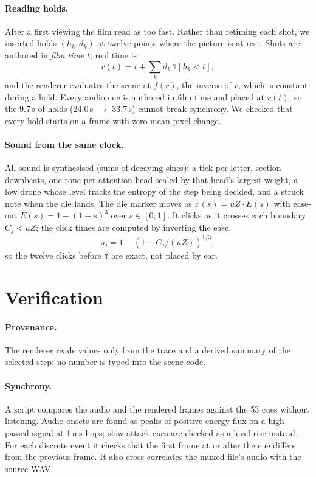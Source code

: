 \documentclass[10pt,twocolumn]{article}
\newcommand{\tok}[1]{\texttt{#1}}
\begin{document}
\paragraph{Reading holds.} After a first viewing the film read as too fast. Rather than retiming each shot,
we inserted holds $(h_k, d_k)$ at twelve points where the picture is at rest. Shots are authored in
\emph{film time} $t$; real time is
\begin{equation}
r(t) = t + \textstyle\sum_k d_k\,\mathbb{1}[h_k < t],
\end{equation}
and the renderer evaluates the scene at $f(r)$, the inverse of $r$, which is constant during a hold.
Every audio cue is authored in film time and placed at $r(t)$, so the 9.7\,s of holds (24.0\,s $\to$ 33.7\,s)
cannot break synchrony. We checked that every hold starts on a frame with zero mean pixel change.

\paragraph{Sound from the same clock.} All sound is synthesised (sums of decaying sines): a tick per letter,
section downbeats, one tone per attention head scaled by that head's largest weight, a low drone whose
level tracks the entropy of the step being decided, and a struck note when the die lands.
The die marker moves as $x(s) = uZ\cdot E(s)$ with ease-out $E(s)=1-(1-s)^3$ over $s\in[0,1]$.
It clicks as it crosses each boundary $C_j < uZ$; the click times are computed by inverting the ease,
\begin{equation}
s_j = 1 - \left(1 - C_j/(uZ)\right)^{1/3},
\end{equation}
so the twelve clicks before \tok{m} are exact, not placed by ear.


\section{Verification}\label{sec:verify}
\paragraph{Provenance.} The renderer reads values only from the trace and a derived summary of the selected step;
no number is typed into the scene code.
\paragraph{Synchrony.} A script compares the audio and the rendered frames against the 53 cues
without listening. Audio onsets are found as peaks of positive energy flux on a high-passed signal at 1\,ms hops;
slow-attack cues are checked as a level rise instead. For each discrete event it checks that the first frame
at or after the cue differs from the previous frame. It also cross-correlates the muxed file's audio with the source WAV.
\end{document}
